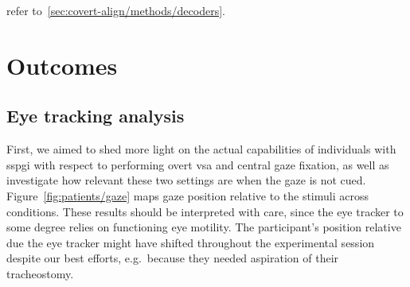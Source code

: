 refer to~\autoref{sec:covert-align/methods/decoders}.

\section{Outcomes}

\subsection{Eye tracking analysis}
\label{sec:patients/outcomes/gaze}

First, we aimed to shed more light on the actual capabilities of individuals
with \ac{sspgi} with respect to performing overt \ac{vsa} and central gaze
fixation, as well as investigate how relevant these two settings are when the
gaze is not cued.
Figure~\ref{fig:patients/gaze} maps gaze position relative to the stimuli
across conditions.
These results should be interpreted with care, since the eye tracker to some
degree relies on functioning eye motility.
The participant's position
relative due the eye tracker might have shifted throughout the experimental
session despite our best efforts, e.g.\ because they needed aspiration of their
tracheostomy.


